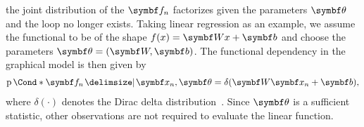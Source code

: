 the joint distribution of the $\mat{f}_n$ factorizes given the parameters $\mat{\theta}$ and the loop no longer exists.
Taking linear regression as an example, we assume the functional to be of the shape $f(x) = \mat{W}x + \mat{b}$ and choose the parameters $\mat{\theta} = (\mat{W}, \mat{b})$.
The functional dependency in the graphical model is then given by
\begin{align}
    \begin{split}
        \Prob*{\mat{f}_n \given \mat{x}_n, \mat{\theta}} = \delta(\mat{W}\mat{x}_n + \mat{b}),
    \end{split}
\end{align}
where $\delta(\cdot)$ denotes the Dirac delta distribution~\parencite{murphy_machine_2012}.
Since $\mat{\theta}$ is a sufficient statistic, other observations are not required to evaluate the linear function.

